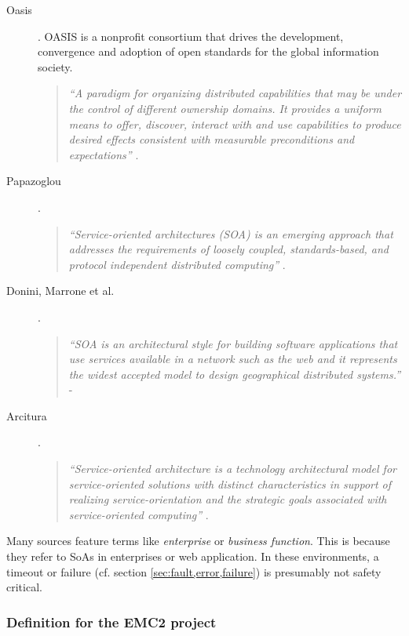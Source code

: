 \begin{description}
	\item [Oasis].
	OASIS is a nonprofit consortium that drives the development, convergence and adoption of open standards for the global information society.
	\begin{quote}
	\emph{``A paradigm for organizing distributed capabilities that may be under the control of different ownership domains. It provides a uniform means to offer, discover, interact with and use capabilities to produce desired effects consistent with measurable preconditions and expectations''} \cite{oasis2006}.
	\end{quote}

	\item [Papazoglou].
	\begin{quote}
	\emph{``Service-oriented architectures (SOA) is an emerging approach that addresses the requirements of loosely coupled, standards-based, and protocol independent distributed computing''} \cite{papazoglou2007}.
	\end{quote}

	\item [Donini, Marrone et al.].
	\begin{quote}
	\emph{``SOA is an architectural style for building software applications that use services available in a network such as the web and it represents the widest accepted model to design geographical distributed systems.''} - \cite{donini2008}
	\end{quote}

	\item [Arcitura].
	\begin{quote}
	\emph{``Service-oriented architecture is a technology architectural model for service-oriented solutions with distinct characteristics in support of realizing service-orientation and the strategic goals associated with service-oriented computing''} \cite{arcitura}.
	\end{quote}
\end{description}

Many sources feature terms like \emph{enterprise} or \emph{business function}. This is because they refer to SoAs in enterprises or web application. In these environments, a timeout or failure (cf. section \ref{sec:fault,error,failure}) is presumably not safety critical.



\subsubsection{Definition for the EMC2 project}

